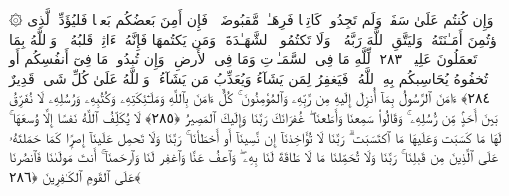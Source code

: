  ۞ وَإِن كُنتُم عَلَىٰ سَفَرٍۢ وَلَم تَجِدُوا۟ كَاتِبًۭا فَرِهَـٰنٌۭ مَّقبُوضَةٌۭ ۖ فَإِن أَمِنَ بَعضُكُم بَعضًۭا فَليُؤَدِّ ٱلَّذِى ٱؤتُمِنَ أَمَـٰنَتَهُۥ وَليَتَّقِ ٱللَّهَ رَبَّهُۥ ۗ وَلَا تَكتُمُوا۟ ٱلشَّهَـٰدَةَ ۚ وَمَن يَكتُمهَا فَإِنَّهُۥٓ ءَاثِمٌۭ قَلبُهُۥ ۗ وَٱللَّهُ بِمَا تَعمَلُونَ عَلِيمٌۭ ﴿٢٨٣﴾
 لِّلَّهِ مَا فِى ٱلسَّمَـٰوَٟتِ وَمَا فِى ٱلأَرضِ ۗ وَإِن تُبدُوا۟ مَا فِىٓ أَنفُسِكُم أَو تُخفُوهُ يُحَاسِبكُم بِهِ ٱللَّهُ ۖ فَيَغفِرُ لِمَن يَشَآءُ وَيُعَذِّبُ مَن يَشَآءُ ۗ وَٱللَّهُ عَلَىٰ كُلِّ شَىءٍۢ قَدِيرٌ ﴿٢٨٤﴾
 ءَامَنَ ٱلرَّسُولُ بِمَآ أُنزِلَ إِلَيهِ مِن رَّبِّهِۦ وَٱلمُؤمِنُونَ ۚ كُلٌّ ءَامَنَ بِٱللَّهِ وَمَلَـٰٓئِكَتِهِۦ وَكُتُبِهِۦ وَرُسُلِهِۦ لَا نُفَرِّقُ بَينَ أَحَدٍۢ مِّن رُّسُلِهِۦ ۚ وَقَالُوا۟ سَمِعنَا وَأَطَعنَا ۖ غُفرَانَكَ رَبَّنَا وَإِلَيكَ ٱلمَصِيرُ ﴿٢٨٥﴾
 لَا يُكَلِّفُ ٱللَّهُ نَفسًا إِلَّا وُسعَهَا ۚ لَهَا مَا كَسَبَت وَعَلَيهَا مَا ٱكتَسَبَت ۗ رَبَّنَا لَا تُؤَاخِذنَآ إِن نَّسِينَآ أَو أَخطَأنَا ۚ رَبَّنَا وَلَا تَحمِل عَلَينَآ إِصرًۭا كَمَا حَمَلتَهُۥ عَلَى ٱلَّذِينَ مِن قَبلِنَا ۚ رَبَّنَا وَلَا تُحَمِّلنَا مَا لَا طَاقَةَ لَنَا بِهِۦ ۖ وَٱعفُ عَنَّا وَٱغفِر لَنَا وَٱرحَمنَآ ۚ أَنتَ مَولَىٰنَا فَٱنصُرنَا عَلَى ٱلقَومِ ٱلكَـٰفِرِينَ ﴿٢٨٦﴾
 

